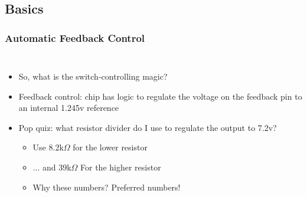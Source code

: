 \documentclass{beamer}
\begin{document}
\subsection{Basics}

\begin{frame}
\frametitle{Automatic Feedback Control}
\begin{columns}[t]
\begin{itemize}
  \item So, what is the switch-controlling magic?
  \item Feedback control: chip has logic to regulate the voltage on the feedback pin to an internal 1.245v reference
  \item Pop quiz: what resistor divider do I use to regulate the output to 7.2v?
  \begin{itemize}
    \item Use 8.2k$\Omega$ for the lower resistor
    \item<2-> ... and 39k$\Omega$ For the higher resistor
    \item<2-> Why these numbers? Preferred numbers!
  \end{itemize}
\end{itemize}


\end{columns}
\end{frame}
\end{document}
